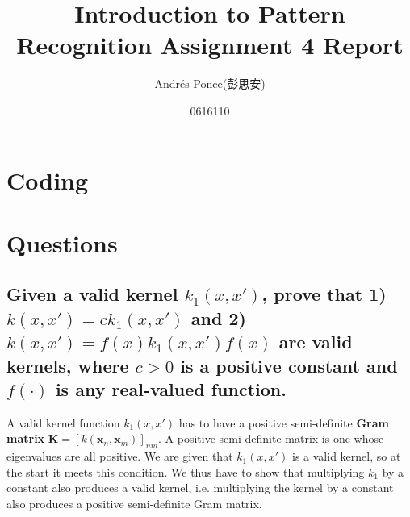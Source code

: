 \documentclass{article}
\title{Introduction to Pattern Recognition Assignment 4 Report}
\author{ Andr\'es Ponce(彭思安) \\
\and
0616110
}
\begin{document}
\maketitle
\section{Coding}

\section{Questions}
	\subsection{Given a valid kernel $k_{1}(x, x')$, prove that 1)
		$k(x, x') = ck_{1}(x, x')$ and 2) $k(x, x') = f(x)k_{1}(x, x')f(x)$ are 
		valid kernels, where $c > 0$ is a positive constant and $f(\cdot)$ is any 
		real-valued function.}
	A valid kernel function $k_{1}(x, x')$ has to have a positive semi-definite \textbf{Gram matrix}
		$\mathbf{K} = [k(\mathbf{x}_{n}, \mathbf{x}_{m})]_{nm}$.
	A positive semi-definite matrix is one whose eigenvalues are all positive. 
	We are given that $k_{1}(x, x')$ is a valid kernel, so at the start it meets this condition.
	We thus have to show that multiplying $k_{1}$ by a constant also produces a valid kernel,
		i.e. multiplying the kernel by a constant also produces a positive semi-definite Gram matrix.
\end{document}

